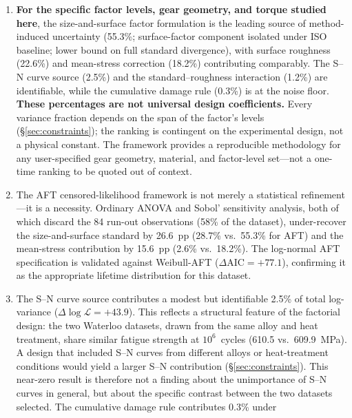 \documentclass[twocolumn,12pt,a4paper]{article}
\begin{document}
\begin{enumerate}
  \item \textbf{For the specific factor levels, gear geometry, and
        torque studied here}, the size-and-surface factor formulation
        is the leading source of method-induced uncertainty (55.3\%;
        surface-factor component isolated under ISO baseline; lower
        bound on full standard divergence), with surface roughness
        (22.6\%) and mean-stress correction (18.2\%) contributing
        comparably. The S--N curve source (2.5\%) and the
        standard--roughness interaction (1.2\%) are identifiable, while
        the cumulative damage rule (0.3\%) is at the noise floor.
        \textbf{These
        percentages are not universal design coefficients.} Every
        variance fraction depends on the span of the factor's levels
        (\S\ref{sec:constraints}); the ranking is contingent on the
        experimental design, not a physical constant. The framework provides a reproducible methodology
        for any user-specified gear geometry, material, and factor-level
        set---not a one-time ranking to be quoted out of context.
  \item The AFT censored-likelihood framework is not merely a statistical
        refinement---it is a necessity. Ordinary ANOVA and Sobol' sensitivity
        analysis, both of which discard the 84 run-out observations
        (58\% of the dataset), under-recover the size-and-surface standard
        by 26.6~pp (28.7\% vs.\ 55.3\% for AFT) and the mean-stress
        contribution by 15.6~pp (2.6\% vs.\ 18.2\%). The log-normal AFT specification is validated against
        Weibull-AFT ($\Delta\mathrm{AIC} = +77.1$), confirming it as the
        appropriate lifetime distribution for this dataset.
  \item The S--N curve source contributes a modest but identifiable
        2.5\% of total log-variance ($\Delta\log\mathcal{L} = +43.9$).
        This reflects a structural feature of the factorial design: the
        two Waterloo datasets, drawn from the same alloy and heat
        treatment, share similar fatigue strength at $10^6$~cycles
        (610.5 vs.\ 609.9~MPa). A design that included S--N curves from
        different alloys or heat-treatment conditions would yield a
        larger S--N contribution (\S\ref{sec:constraints}). This
        near-zero result is therefore not a finding about the
        unimportance of S--N curves in general, but about the
        specific contrast between the two datasets selected.
        The cumulative damage rule contributes 0.3\% under

\end{enumerate}
\end{document}
